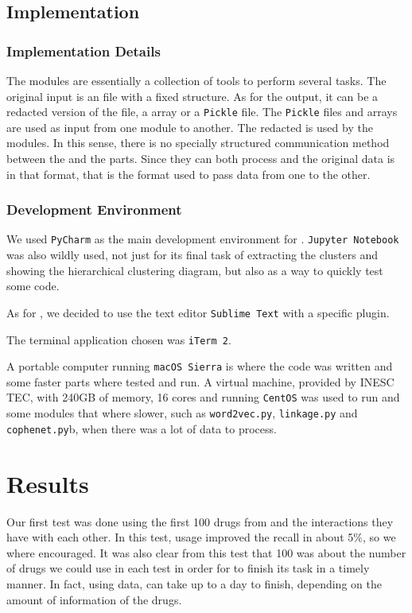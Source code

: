 \documentclass[12pt, openany]{book}
\begin{document}
\section{Implementation}
\subsection{Implementation Details}

The \python modules are essentially a collection of tools to perform several tasks. The original input is an \xml file with a fixed structure. As for the output, it can be a redacted version of the \xml file, a \numpy array or a \texttt{Pickle} file. The \texttt{Pickle} files and \numpy arrays are used as input from one \python module to another. The redacted \xml is used by the \prolog modules. In this sense, there is no specially structured communication method between the \python and the \prolog parts. Since they can both process \xml and the original data is in that format, that is the format used to pass data from one to the other.

\subsection{Development Environment}

We used \texttt{PyCharm} as the main development environment for \python. \texttt{Jupyter Notebook} was also wildly used, not just for its final task of extracting the clusters and showing the hierarchical clustering diagram, but also as a way to quickly test some \python code.

As for \prolog, we decided to use the text editor \texttt{Sublime Text} with a specific \prolog plugin.

The terminal application chosen was \texttt{iTerm 2}.

A portable computer running \texttt{macOS Sierra} is where the code was written and some faster parts where tested and run. A virtual machine, provided by INESC TEC, with 240GB of memory, 16 cores and running \texttt{CentOS} was used to run \alephilp and some \python modules that where slower, such as \texttt{word2vec.py}, \texttt{linkage.py} and \texttt{cophenet.py}b, when there was a lot of data to process.

\chapter{Results}

Our first test was done using the first 100 drugs from \drugbank and the interactions they have with each other. In this test, \wordvec usage improved the recall in about 5\%, so we where encouraged. It was also clear from this test that 100 was about the number of drugs we could use in each test in order for \alephilp to finish its task in a timely manner. In fact, using \wordvec data, \alephilp can take up to a day to finish, depending on the amount of information of the drugs.
\end{document}
